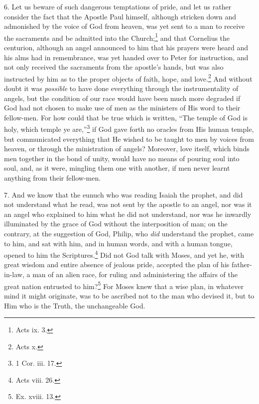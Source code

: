 6. Let us beware of such dangerous temptations of pride, and let us rather consider the fact that the Apostle Paul himself, although stricken down and admonished by the voice of God from heaven, was yet sent to a man to receive the sacraments and be admitted into the Church;\footnote{Acts ix. 3.} and that Cornelius the centurion, although an angel announced to him that his prayers were heard and his alms had in remembrance, was yet handed over to Peter for instruction, and not only received the sacraments from the apostle’s hands, but was also instructed by him as to the proper objects of faith, hope, and love.\footnote{Acts x.} And without doubt it was \emph{possible} to have done everything through the instrumentality of angels, but the condition of our race would have been much more degraded if God had not chosen to make use of men as the ministers of His word to their fellow-men. For how could that be true which is written, “The temple of God is holy, which temple ye are,”\footnote{1 Cor. iii. 17.} if God gave forth no oracles from His human temple, but communicated everything that He wished to be taught to men by voices from heaven, or through the ministration of angels? Moreover, love itself, which binds men together in the bond of unity, would have no means of pouring soul into soul, and, as it were, mingling them one with another, if men never learnt anything from their fellow-men.

7. And we know that the eunuch who was reading Isaiah the prophet, and did not understand what he read, was not sent by the apostle to an angel, nor was it an angel who explained to him what he did not understand, nor was he inwardly illuminated by the grace of God without the interposition of man; on the contrary, at the suggestion of God, Philip, who \emph{ did} understand the prophet, came to him, and sat with him, and in human words, and with a human tongue, opened to him the Scriptures.\footnote{Acts viii. 26.} Did not God talk with Moses, and yet he, with great wisdom and entire absence of jealous pride, accepted the plan of his father-in-law, a man of an alien race, for ruling and administering the affairs of the great nation entrusted to him?\footnote{Ex. xviii. 13.} For Moses knew that a wise plan, in whatever mind it might originate, was to be ascribed not to the man who devised it, but to Him who is the Truth, the unchangeable God.

